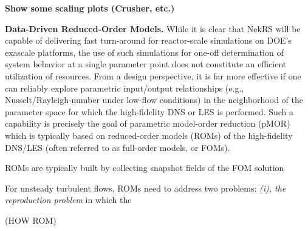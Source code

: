 {\bf Show some scaling plots (Crusher, etc.)}

\noindent
{\bf Data-Driven Reduced-Order Models.}
While it is clear that NekRS will be capable of delivering fast turn-around
for reactor-scale simulations on DOE's exascale platforms, the use of 
such simulations for one-off determination of system behavior at a single
parameter point does not constitute an efficient utilization of resources. 
From a design perspective, it is far more effective if one can reliably explore
parametric input/output relationships (e.g., Nusselt/Rayleigh-number under
low-flow conditions) in the neighborhood of the parameter space for which
the high-fidelity DNS or LES is performed.   Such a capability is precisely
the goal of parametric model-order reduction (pMOR) which is typically based
on reduced-order models (ROMs) of the high-fidelity DNS/LES (often referred
to as full-order models, or FOMs).   

ROMs are typically built by collecting snapshot fields of the FOM solution


For unsteady turbulent flows, ROMs need to address two problems: 
{\em (i), the reproduction problem} in which the 




(HOW ROM)










